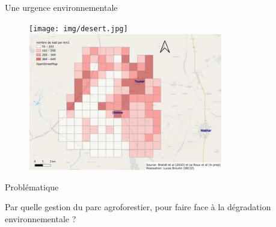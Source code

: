 \documentclass[aspectratio=169]{beamer}
\begin{document}
\begin{frame}{Une urgence environnementale}
    \begin{center}
        \vspace{-1em}
        \begin{figure}
            \centering
            \texttt{[image: img/desert.jpg]}~
            \includegraphics[height = 6cm]{img/densiteArbres.png}
        \end{figure}
    \end{center}
\end{frame}

\begin{frame}{Problématique}
    \begin{center}
        \large{Par quelle gestion du parc agroforestier, pour faire face à la dégradation environnementale ?}
    \end{center}
\end{frame}
\end{document}
